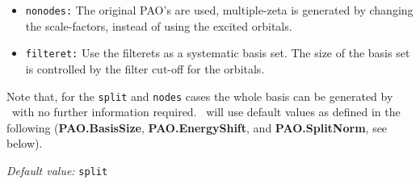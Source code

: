 \begin{description}
\begin{itemize}
\item \texttt{nonodes:}
The original PAO's are used, multiple-zeta is generated
by changing the scale-factors, instead of using the excited orbitals.

\item \texttt{filteret:} Use the filterets as a systematic basis set.
The size of the basis set is controlled by the filter cut-off for
the orbitals.

\end{itemize}

\noindent
Note that, for the \texttt{split} and \texttt{nodes} cases
the whole basis can be generated by \siesta\ with no further information
required. \siesta\ will use default values as defined in the following
(\textbf{PAO.BasisSize},
\textbf{PAO.EnergyShift}, and \textbf{PAO.SplitNorm}, see below).

\textit{Default value:} \texttt{split}

\end{description}

